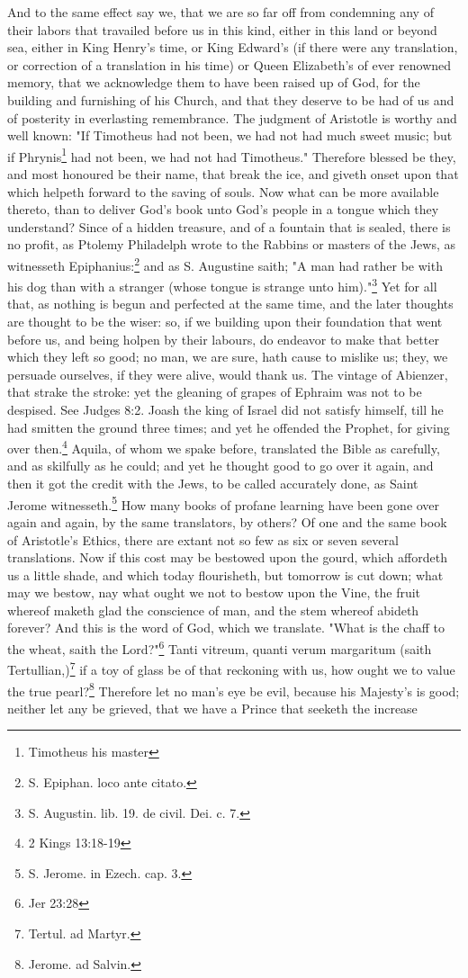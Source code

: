 And to the same effect say we, that we are so far off from condemning any of their labors that travailed before us in this kind, either in this land or beyond sea, either in King Henry's time, or King Edward's (if there were any translation, or correction of a translation in his time) or Queen Elizabeth's of ever renowned memory, that we acknowledge them to have been raised up of God, for the building and furnishing of his Church, and that they deserve to be had of us and of posterity in everlasting remembrance. The judgment of Aristotle is worthy and well known: "If Timotheus had not been, we had not had much sweet music; but if Phrynis\footnote{Timotheus his master} had not been, we had not had Timotheus." Therefore blessed be they, and most honoured be their name, that break the ice, and giveth onset upon that which helpeth forward to the saving of souls. Now what can be more available thereto, than to deliver God's book unto God's people in a tongue which they understand? Since of a hidden treasure, and of a fountain that is sealed, there is no profit, as Ptolemy Philadelph wrote to the Rabbins or masters of the Jews, as witnesseth Epiphanius:\footnote{S. Epiphan. loco ante citato.} and as S. Augustine saith; "A man had rather be with his dog than with a stranger (whose tongue is strange unto him)."\footnote{S. Augustin. lib. 19. de civil. Dei. c. 7.} Yet for all that, as nothing is begun and perfected at the same time, and the later thoughts are thought to be the wiser: so, if we building upon their foundation that went before us, and being holpen by their labours, do endeavor to make that better which they left so good; no man, we are sure, hath cause to mislike us; they, we persuade ourselves, if they were alive, would thank us. The vintage of Abienzer, that strake the stroke: yet the gleaning of grapes of Ephraim was not to be despised. See Judges 8:2. Joash the king of Israel did not satisfy himself, till he had smitten the ground three times; and yet he offended the Prophet, for giving over then.\footnote{2 Kings 13:18-19} Aquila, of whom we spake before, translated the Bible as carefully, and as skilfully as he could; and yet he thought good to go over it again, and then it got the credit with the Jews, to be called accurately done, as Saint Jerome witnesseth.\footnote{S. Jerome. in Ezech. cap. 3.} How many books of profane learning have been gone over again and again, by the same translators, by others? Of one and the same book of Aristotle's Ethics, there are extant not so few as six or seven several translations. Now if this cost may be bestowed upon the gourd, which affordeth us a little shade, and which today flourisheth, but tomorrow is cut down; what may we bestow, nay what ought we not to bestow upon the Vine, the fruit whereof maketh glad the conscience of man, and the stem whereof abideth forever? And this is the word of God, which we translate. "What is the chaff to the wheat, saith the Lord?"\footnote{Jer 23:28} Tanti vitreum, quanti verum margaritum (saith Tertullian,)\footnote{Tertul. ad Martyr.} if a toy of glass be of that reckoning with us, how ought we to value the true pearl?\footnote{Jerome. ad Salvin.} Therefore let no man's eye be evil, because his Majesty's is good; neither let any be grieved, that we have a Prince that seeketh the increase 